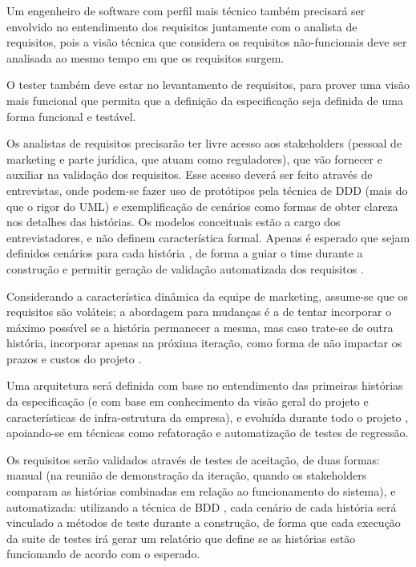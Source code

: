 \documentclass[12pt,journal,compsoc]{IEEEtran}
\begin{document}
Um engenheiro de software com perfil mais técnico também precisará ser envolvido no entendimento dos requisitos juntamente com o analista de requisitos, pois a visão técnica que considera os requisitos não-funcionais deve ser analisada ao mesmo tempo em que os requisitos surgem.

O tester também deve estar no levantamento de requisitos, para prover uma visão mais funcional que permita que a definição da especificação seja definida de uma forma funcional e testável.

Os analistas de requisitos precisarão ter livre acesso aos stakeholders (pessoal
de marketing e parte jurídica, que atuam como reguladores), que vão fornecer e
auxiliar na validação dos requisitos. Esse acesso deverá ser feito através de
entrevistas, onde podem-se fazer uso de protótipos pela técnica de DDD \cite{evans_domain-driven_2004}  
(mais do que o rigor do UML) e exemplificação de
cenários como formas de obter clareza nos detalhes das histórias. Os modelos
conceituais estão a cargo dos entrevistadores, e não definem característica
formal. Apenas é esperado que sejam definidos cenários para cada história
\cite{washington2003using}, de forma a guiar o time durante a construção e
permitir geração de validação automatizada dos requisitos
\cite{melnik_multiple_2007}.

Considerando a característica dinâmica da equipe de marketing, assume-se que os requisitos são voláteis; a abordagem para mudanças é a de tentar incorporar o máximo possível se a história permanecer a mesma, mas caso trate-se de outra história, incorporar apenas na próxima iteração, como forma de não impactar os prazos e custos do projeto \cite{zowghi2002study}.

Uma arquitetura será definida com base no entendimento das primeiras histórias da especificação (e com base em conhecimento da visão geral do projeto e características de infra-estrutura da empresa), e evoluída durante todo o projeto \cite{cohn_agile_2009}, apoiando-se em técnicas como refatoração e automatização de testes de regressão.

Os requisitos serão validados através de testes de aceitação, de duas formas:
manual (na reunião de demonstração da iteração, quando os stakeholders comparam
as histórias combinadas em relação ao funcionamento do sistema), e
automatizada: utilizando a técnica de BDD \cite{chelimsky2010rspec}, cada
cenário de cada história será vinculado a métodos de teste durante a
construção, de forma que cada execução da suite de testes irá gerar um
relatório que define se as histórias estão funcionando de acordo com o
esperado.
\end{document}
